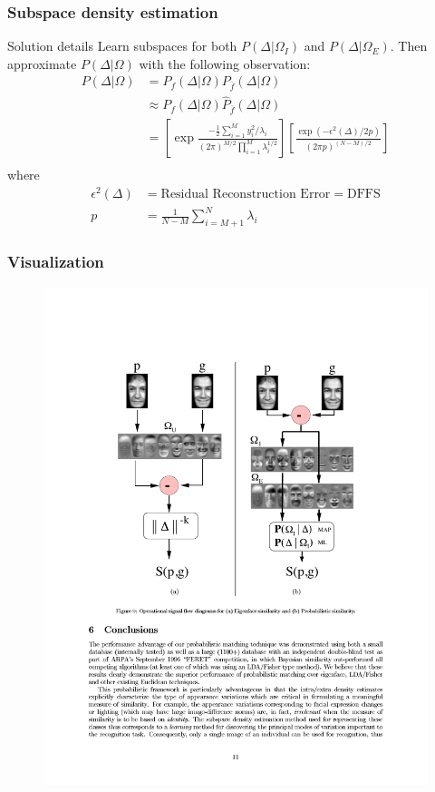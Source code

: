 \documentclass{beamer}
\begin{document}
\begin{frame}
\frametitle{Subspace density estimation}
\begin{block}{Solution details}
Learn subspaces for both $P(\Delta|\Omega_I)$ and $P(\Delta|\Omega_E)$.
\pause
Then approximate $P(\Delta|\Omega)$ with the following observation:
\begin{equation}
\begin{split}
P(\Delta|\Omega)& = P_f(\Delta|\Omega)P_{\bar{f}}(\Delta|\Omega) \\
& \approx P_f(\Delta|\Omega)\hat{P}_{\bar{f}}(\Delta|\Omega) \\
& = \left[\exp\frac{-\frac{1}{2}\sum_{i=1}^My_i^2/\lambda_i}{(2\pi)^{M/2}\prod_{i=1}^M\lambda_i^{1/2}}\right]\left[\frac{\exp(-\epsilon^2(\Delta)/2p)}{(2\pi p)^{(N-M)/2}}\right] \\
\end{split}
\end{equation}
\pause
where
\begin{align}
\epsilon^2(\Delta)& = \text{Residual Reconstruction Error} = \text{DFFS} \\
p& = \frac{1}{N-M}\sum_{i=M+1}^N\lambda_i
\end{align}
\end{block}
\end{frame}

\begin{frame}
\frametitle{Visualization}
\begin{figure}[H]
\centering
\includegraphics[height=\textheight, trim=1.6in 3.75in 1.6in 1.6in, clip]{Moghaddam13}
\end{figure}
\end{frame}
\end{document}
